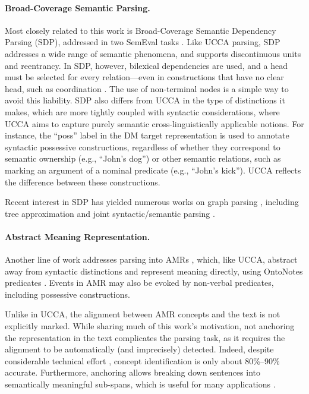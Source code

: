 \documentclass[11pt,a4paper]{article}
\begin{document}
\paragraph{Broad-Coverage Semantic Parsing.}
Most closely related to this work is Broad-Coverage Semantic Dependency Parsing (SDP),
addressed in two SemEval tasks \cite{oepen2014semeval,oepen2015semeval}.
Like UCCA parsing, SDP addresses a wide range of semantic phenomena,
and supports discontinuous units and reentrancy.
In SDP, however, bilexical dependencies are used,
and a head must be selected for every relation---even in constructions that have no clear head,
such as coordination \cite{Ivanova2012who}.
The use of non-terminal nodes is a simple way to avoid this liability.
SDP also differs from UCCA in the type of distinctions it makes,
which are more tightly coupled with syntactic considerations,
where UCCA aims to capture purely semantic cross-linguistically applicable notions.
For instance, the ``poss'' label in the DM target representation is used to
annotate syntactic possessive constructions, regardless of whether they correspond to
semantic ownership (e.g., ``John's dog'') or other semantic relations,
such as marking an argument of a nominal predicate (e.g., ``John's kick'').
UCCA reflects the difference between these constructions.

Recent interest in SDP has yielded numerous works on graph parsing
\cite{ribeyre-villemontedelaclergerie-seddah:2014:SemEval,thomson-EtAl:2014:SemEval,almeida-martins:2015:SemEval,du-EtAl:2015:SemEval}, including
tree approximation \cite{agic-koller:2014:SemEval,schluter-EtAl:2014:SemEval}
and joint syntactic/semantic parsing
\cite{henderson2013multilingual,swayamdipta-EtAl:2016:CoNLL}.

\paragraph{Abstract Meaning Representation.}
Another line of work addresses parsing into AMRs
\cite{flanigan2014discriminative,vanderwende2015amr,pust2015parsing,artzi2015broad},
which, like UCCA, abstract away from syntactic distinctions
and represent meaning directly, using OntoNotes predicates \cite{weischedel2013ontonotes}.
Events in AMR may also be evoked by non-verbal predicates, including possessive constructions.

Unlike in UCCA, the alignment between AMR concepts and the text is not explicitly marked.
While sharing much of this work's motivation, not anchoring the representation in the text
complicates the parsing task, as it requires
the alignment to be automatically (and imprecisely) detected.
Indeed, despite considerable technical effort
\cite{flanigan2014discriminative,pourdamghani2014aligning,werling2015robust},
concept identification is only about 80\%--90\% accurate.
Furthermore, anchoring allows breaking down sentences into semantically meaningful sub-spans,
which is useful for many applications \cite{fernandez2015parsing,birch2016hume}.
\end{document}
